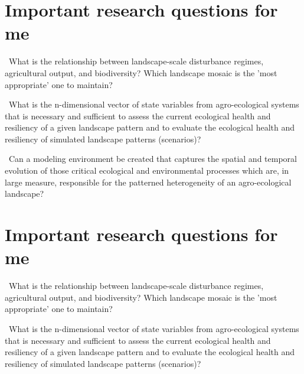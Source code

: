\documentclass[
paper=128mm:96mm, %
fontsize=11pt, %
pagesize, %
parskip=half-, %
]{scrartcl} %
\theoremstyle{mythmstyle} %
\begin{document}

\clearpage
\section{Important research questions for me}
\textasteriskcentered \ What is the relationship between landscape-scale disturbance regimes, agricultural output, and biodiversity? Which landscape mosaic is the 'most appropriate' one to maintain?

\textasteriskcentered \ What is the n-dimensional vector of state variables from agro-ecological systems that is necessary and sufficient to assess the current ecological health and resiliency of a given landscape pattern and to evaluate the ecological health and resiliency of simulated landscape patterns (scenarios)?

\textasteriskcentered \ Can a modeling environment be created that captures the spatial and temporal evolution of those critical ecological and environmental processes which are, in large measure, responsible for the patterned heterogeneity of an agro-ecological landscape?

\clearpage
\section{Important research questions for me}
\textasteriskcentered \ What is the relationship between landscape-scale disturbance regimes, agricultural output, and biodiversity? Which landscape mosaic is the 'most appropriate' one to maintain?

\textasteriskcentered \ What is the n-dimensional vector of state variables from agro-ecological systems that is necessary and sufficient to assess the current ecological health and resiliency of a given landscape pattern and to evaluate the ecological health and resiliency of simulated landscape patterns (scenarios)?
\end{document}
